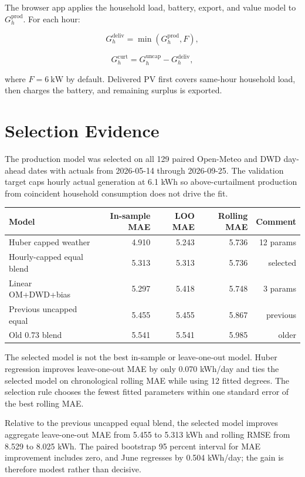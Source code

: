 \documentclass[11pt,a4paper]{article}
\begin{document}
The browser app applies the household load, battery, export, and value model to \(G^{\mathrm{prod}}_h\). For each hour:

\[
G^{\mathrm{deliv}}_h = \min(G^{\mathrm{prod}}_h, F),
\]

\[
G^{\mathrm{curt}}_h = G^{\mathrm{uncap}}_h - G^{\mathrm{deliv}}_h,
\]

where \(F=6\ \mathrm{kW}\) by default. Delivered PV first covers same-hour household load, then charges the battery, and remaining surplus is exported.

\section{Selection Evidence}

The production model was selected on all 129 paired Open-Meteo and DWD day-ahead dates with actuals from 2026-05-14 through 2026-09-25. The validation target caps hourly actual generation at 6.1 kWh so above-curtailment production from coincident household consumption does not drive the fit.

\begin{center}
\begin{tabular}{lrrrr}
\toprule
Model & In-sample MAE & LOO MAE & Rolling MAE & Comment \\
\midrule
Huber capped weather & 4.910 & 5.243 & 5.736 & 12 params \\
Hourly-capped equal blend & 5.313 & 5.313 & 5.736 & selected \\
Linear OM+DWD+bias & 5.297 & 5.418 & 5.748 & 3 params \\
Previous uncapped equal & 5.455 & 5.455 & 5.867 & previous \\
Old 0.73 blend & 5.541 & 5.541 & 5.985 & older \\
\bottomrule
\end{tabular}
\end{center}

The selected model is not the best in-sample or leave-one-out model. Huber regression improves leave-one-out MAE by only 0.070 kWh/day and ties the selected model on chronological rolling MAE while using 12 fitted degrees. The selection rule chooses the fewest fitted parameters within one standard error of the best rolling MAE.

Relative to the previous uncapped equal blend, the selected model improves aggregate leave-one-out MAE from 5.455 to 5.313 kWh and rolling RMSE from 8.529 to 8.025 kWh. The paired bootstrap 95 percent interval for MAE improvement includes zero, and June regresses by 0.504 kWh/day; the gain is therefore modest rather than decisive.
\end{document}
